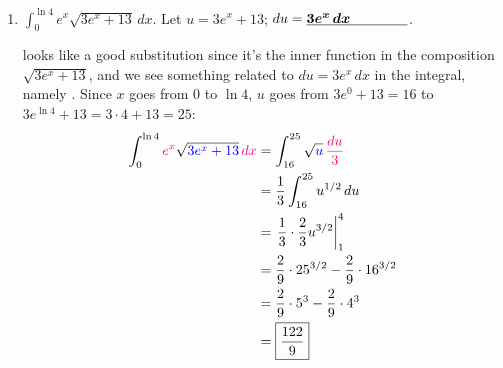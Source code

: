 \documentclass{article}
\begin{document}
\begin{enumerate}
\begin{enumerate}[topsep=0pt]
    \begin{solution}
       looks like a reasonable substitution since it's
      in the denominator and we see something related to $du = 2x\,dx$ in
      the integral, namely .  Then,
      \begin{align*}
        \int \frac{\subd{x}}{\sub{x^2 + 9}}\,\subd{dx} &= \int
        \frac{1}{u} \left( \frac{1}{2}\,du \right) \\
        &= \frac{1}{2} \int \frac{1}{u}\,du \\
        &= \frac{1}{2} \ln |u| + C \\
        &= \boxed{\frac{1}{2} \ln |x^2 + 9| + C}
      \end{align*}
      Let's check.  First, notice that $x^2 + 9$ is always positive,
      so $|x^2 + 9|$ is the same as $x^2 + 9$.  Therefore, another way
      of writing our answer is $\frac{1}{2} \ln (x^2 + 9) + C$:
      \[ \frac{d}{dx} \left(\frac{1}{2}
        \fcolorbox{red}{white}{$\displaystyle
          \ln\left(\fcolorbox{blue}{white}{$\displaystyle x^ { 2} +
              9$}\right)$}\right) = \frac{1}{2} \cdot \frac{1}{x^ { 2} +
        9}\cdot 2 x = \frac{x}{x^2 + 9} \checkmark\]
    \end{solution}

    \pspace{\newpage}

  \item
    \begin{problem}[\vfill]
      $\displaystyle \int_0^{\ln 4} e^{x} \sqrt{3 e^x+13}\,dx$.
      Let $u = 3 e^x+13$; $du=\fitb{1in}{3e^x\,dx}$.
    \end{problem}

    \begin{solution}
       looks like a good substitution since it's the
      inner function in the composition $\sqrt{3 e^x + 13}$, and we see
      something related to $du = 3 e^x\,dx$ in the integral, namely
      .  Since $x$ goes from $0$ to $\ln
      4$, $u$ goes from $3 e^0 + 13 = 16$ to $3 e^{\ln 4} + 13 = 3 \cdot 4
      + 13 = 25$:
      \begin{align*}
        \int_0^{\ln 4} \subd{e^x} \sqrt{\sub{3 e^x + 13}}\,\subd{dx} &=
        \int_{16}^{25} \sqrt{\sub{u}}\, \subd{\frac{du}{3}} \\
        &= \frac{1}{3} \int_{16}^{25} u^{1/2}\,du \\
        &= \left. \frac{1}{3} \cdot \frac{2}{3} u^{3/2} \right|_1^4 \\
        &= \frac{2}{9} \cdot 25^{3/2} - \frac{2}{9} \cdot 16^{3/2} \\
        &= \frac{2}{9} \cdot 5^3 - \frac{2}{9} \cdot 4^3 \\
        &= \boxed{\frac{122}{9}}
      \end{align*}
    \end{solution}


\end{enumerate}
\end{enumerate}
\end{document}
